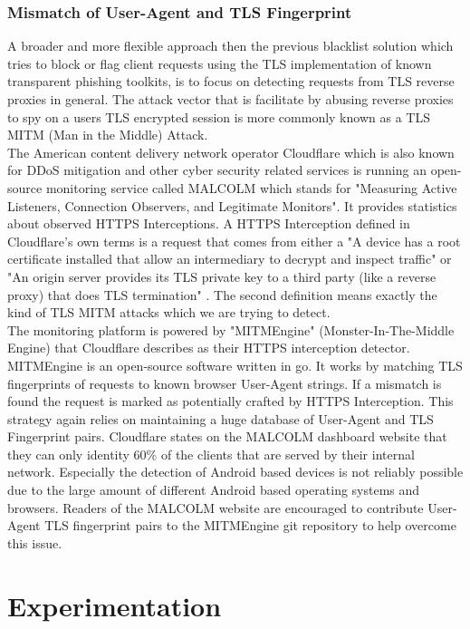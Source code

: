 \documentclass[12pt]{scrbook}
\begin{document}
\newpage \subsection{Mismatch of User-Agent and TLS Fingerprint} A broader and
more flexible approach then the previous blacklist solution which tries to
block or flag client requests using the TLS implementation of known
transparent phishing toolkits, is to focus on detecting requests from TLS
reverse proxies in general. The attack vector that is facilitate by abusing
reverse proxies to spy on a users TLS encrypted session is more commonly known
as a TLS MITM (Man in the Middle) Attack.\\The American content delivery
network operator Cloudflare which is also known for DDoS mitigation and other
cyber security related services is running an open-source monitoring service
called MALCOLM which stands for "Measuring Active Listeners, Connection
Observers, and Legitimate Monitors". It provides statistics about observed
HTTPS Interceptions. A HTTPS Interception defined in Cloudflare's own terms is
a request that comes from either a "A device has a root certificate installed
that allow an intermediary to decrypt and inspect traffic" or "An origin
server provides its TLS private key to a third party (like a reverse proxy)
that does TLS termination" \cite{cloudflareMALCOLM}. The second definition
means exactly the kind of TLS MITM attacks which we are trying to detect.\\The
monitoring platform is powered by "MITMEngine" (Monster-In-The-Middle Engine)
that Cloudflare describes as their HTTPS interception detector. MITMEngine is
an open-source software written in go. It works by matching TLS fingerprints
of requests to known browser User-Agent strings. If a mismatch is found the
request is marked as potentially crafted by HTTPS Interception. This strategy
again relies on maintaining a huge database of User-Agent and TLS Fingerprint
pairs. Cloudflare states on the MALCOLM dashboard website that they can only
identity 60\% of the clients that are served by their internal network.
Especially the detection of Android based devices is not reliably possible due
to the large amount of different Android based operating systems and browsers.
Readers of the MALCOLM website are encouraged to contribute User-Agent TLS
fingerprint pairs to the MITMEngine git repository to help overcome this
issue.


\newpage
\chapter{Experimentation}
\end{document}
